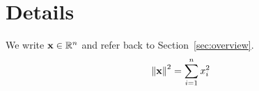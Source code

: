 \section{Details}\label{sec:details}
We write $\mathbf{x} \in \mathbb{R}^{n}$ and refer back to Section~\ref{sec:overview}.
\[ \left\lVert \mathbf{x} \right\rVert^{2} = \sum_{i=1}^{n} x_{i}^{2} \]

